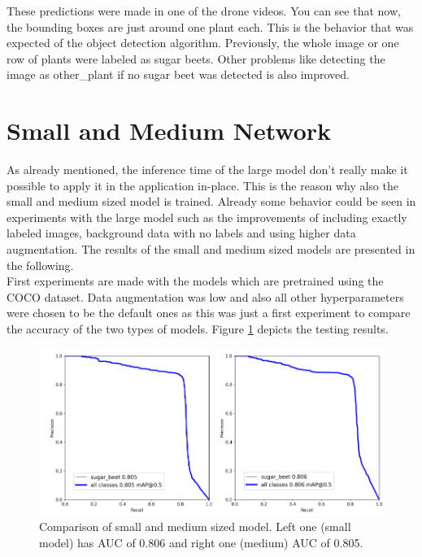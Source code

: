 These predictions were made in one of the drone videos. You can see that now, the bounding boxes are just around one plant each. This is the behavior that was expected of the object detection algorithm. Previously, the whole image or one row of plants were labeled as sugar beets. Other problems like detecting the image as other\_plant if no sugar beet was detected is also improved. 

\section{Small and Medium Network}

As already mentioned, the inference time of the large model don't really make it possible to apply it in the application in-place. This is the reason why also the small and medium sized model is trained. Already some behavior could be seen in experiments with the large model such as the improvements of including exactly labeled images, background data with no labels and using higher data augmentation. The results of the small and medium sized models are presented in the following. \\

First experiments are made with the models which are pretrained using the COCO dataset. Data augmentation was low and also all other hyperparameters were chosen to be the default ones as this was just a first experiment to compare the accuracy of the two types of models. Figure \ref{fig:comparison_small_medium} depicts the testing results. 

\begin{figure}[htb!]
	\centering
	\includegraphics[scale=0.4]{figures/comparison_small_medium.png}
	\caption{Comparison of small and medium sized model. Left one (small model) has AUC of 0.806 and right one (medium) AUC of 0.805.}
	\label{fig:comparison_small_medium}
\end{figure}

